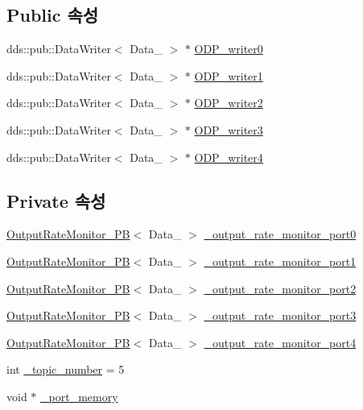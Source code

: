 \subsection*{Public 속성}
\begin{DoxyCompactItemize}
\item 
dds\+::pub\+::\+Data\+Writer$<$ Data\+\_ $>$ $\ast$ \hyperlink{classOutputDataPort__PB_aef51cf50cf81a472d598409204935554}{O\+D\+P\+\_\+writer0}
\item 
dds\+::pub\+::\+Data\+Writer$<$ Data\+\_ $>$ $\ast$ \hyperlink{classOutputDataPort__PB_ab739d73bd648f7818a08a5189b6faf0e}{O\+D\+P\+\_\+writer1}
\item 
dds\+::pub\+::\+Data\+Writer$<$ Data\+\_ $>$ $\ast$ \hyperlink{classOutputDataPort__PB_afdadb002de2a43a95c91d59b79c055d2}{O\+D\+P\+\_\+writer2}
\item 
dds\+::pub\+::\+Data\+Writer$<$ Data\+\_ $>$ $\ast$ \hyperlink{classOutputDataPort__PB_a8445d09227ccdf35a490b43474d601cd}{O\+D\+P\+\_\+writer3}
\item 
dds\+::pub\+::\+Data\+Writer$<$ Data\+\_ $>$ $\ast$ \hyperlink{classOutputDataPort__PB_ad5b06dde3b83d3a2e11138f4b58735a1}{O\+D\+P\+\_\+writer4}
\end{DoxyCompactItemize}
\subsection*{Private 속성}
\begin{DoxyCompactItemize}
\item 
\hyperlink{classOutputRateMonitor__PB}{Output\+Rate\+Monitor\+\_\+\+PB}$<$ Data\+\_ $>$ \hyperlink{classOutputDataPort__PB_a9769b9c90c8012660cf4b45a2d334b6e}{\+\_\+output\+\_\+rate\+\_\+monitor\+\_\+port0}
\item 
\hyperlink{classOutputRateMonitor__PB}{Output\+Rate\+Monitor\+\_\+\+PB}$<$ Data\+\_ $>$ \hyperlink{classOutputDataPort__PB_a9a25f52cb2a6e719792ba9e6b74a5ba6}{\+\_\+output\+\_\+rate\+\_\+monitor\+\_\+port1}
\item 
\hyperlink{classOutputRateMonitor__PB}{Output\+Rate\+Monitor\+\_\+\+PB}$<$ Data\+\_ $>$ \hyperlink{classOutputDataPort__PB_a46dd27ed92cc254ac6898ecbafed5897}{\+\_\+output\+\_\+rate\+\_\+monitor\+\_\+port2}
\item 
\hyperlink{classOutputRateMonitor__PB}{Output\+Rate\+Monitor\+\_\+\+PB}$<$ Data\+\_ $>$ \hyperlink{classOutputDataPort__PB_a5822e1818001616cc37171b203ee6321}{\+\_\+output\+\_\+rate\+\_\+monitor\+\_\+port3}
\item 
\hyperlink{classOutputRateMonitor__PB}{Output\+Rate\+Monitor\+\_\+\+PB}$<$ Data\+\_ $>$ \hyperlink{classOutputDataPort__PB_a3f057d0ef808f2aa72b68f8a10c89ce4}{\+\_\+output\+\_\+rate\+\_\+monitor\+\_\+port4}
\item 
int \hyperlink{classOutputDataPort__PB_a54ea60b6f431113133f57a4e98b2d660}{\+\_\+topic\+\_\+number} = 5
\item 
void $\ast$ \hyperlink{classOutputDataPort__PB_ad8c3303f5857e0dd6721f2fdb7c894bc}{\+\_\+port\+\_\+memory}
\end{DoxyCompactItemize}


